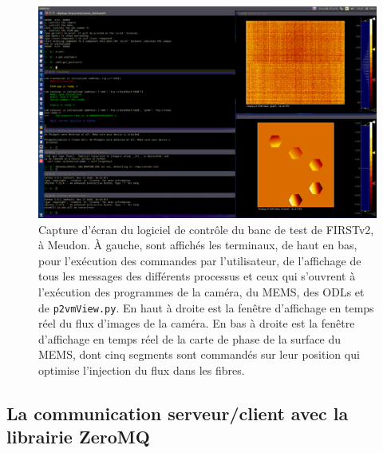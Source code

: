 \begin{figure}[ht!]
    \centering
    \includegraphics[angle=90,height=0.78\textheight]{Figure_Chap2/FIRSTv2_ControlSoftware_ScreenShot.png}
    \caption[Capture d'écran du logiciel de contrôle du banc de test de FIRSTv2, à Meudon.]{Capture d'écran du logiciel de contrôle du banc de test de FIRSTv2, à Meudon. À gauche, sont affichés les terminaux, de haut en bas, pour l'exécution des commandes par l'utilisateur, de l'affichage de tous les messages des différents processus et ceux qui s'ouvrent à l'exécution des programmes de la caméra, du MEMS, des ODLs et de \texttt{p2vmView.py}. En haut à droite est la fenêtre d'affichage en temps réel du flux d'images de la caméra. En bas à droite est la fenêtre d'affichage en temps réel de la carte de phase de la surface du MEMS, dont cinq segments sont commandés sur leur position qui optimise l'injection du flux dans les fibres.}
    \label{fig:SoftwareScreenShot}
\end{figure}


\subsection{La communication serveur/client avec la librairie ZeroMQ}
\label{sec:ZMQ}

